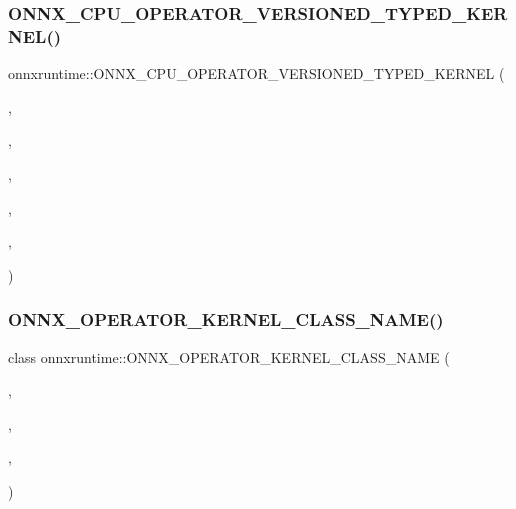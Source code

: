 \subsubsection{\texorpdfstring{O\+N\+N\+X\+\_\+\+C\+P\+U\+\_\+\+O\+P\+E\+R\+A\+T\+O\+R\+\_\+\+V\+E\+R\+S\+I\+O\+N\+E\+D\+\_\+\+T\+Y\+P\+E\+D\+\_\+\+K\+E\+R\+N\+E\+L()}{ONNX\_CPU\_OPERATOR\_VERSIONED\_TYPED\_KERNEL()}\hspace{0.1cm}{\footnotesize\ttfamily [2/2]}}
{\footnotesize\ttfamily onnxruntime\+::\+O\+N\+N\+X\+\_\+\+C\+P\+U\+\_\+\+O\+P\+E\+R\+A\+T\+O\+R\+\_\+\+V\+E\+R\+S\+I\+O\+N\+E\+D\+\_\+\+T\+Y\+P\+E\+D\+\_\+\+K\+E\+R\+N\+EL (\begin{DoxyParamCaption}\item[{\mbox{\hyperlink{classonnxruntime_1_1Greater}{Greater}}}]{,  }\item[{7}]{,  }\item[{9}]{,  }\item[{float}]{,  }\item[{\mbox{\hyperlink{classonnxruntime_1_1KernelDefBuilder}{Kernel\+Def\+Builder}}().Type\+Constraint(\char`\"{}T\char`\"{}, Data\+Type\+Impl\+::\+Get\+Tensor\+Type$<$ float $>$())}]{,  }\item[{\mbox{\hyperlink{classonnxruntime_1_1Greater}{Greater}}$<$ float $>$}]{ }\end{DoxyParamCaption})}

\mbox{\label{namespaceonnxruntime_a12965abed5f8d0fae3ef21bdbd7793dc}} 
\subsubsection{\texorpdfstring{O\+N\+N\+X\+\_\+\+O\+P\+E\+R\+A\+T\+O\+R\+\_\+\+K\+E\+R\+N\+E\+L\+\_\+\+C\+L\+A\+S\+S\+\_\+\+N\+A\+M\+E()}{ONNX\_OPERATOR\_KERNEL\_CLASS\_NAME()}\hspace{0.1cm}{\footnotesize\ttfamily [1/84]}}
{\footnotesize\ttfamily class onnxruntime\+::\+O\+N\+N\+X\+\_\+\+O\+P\+E\+R\+A\+T\+O\+R\+\_\+\+K\+E\+R\+N\+E\+L\+\_\+\+C\+L\+A\+S\+S\+\_\+\+N\+A\+ME (\begin{DoxyParamCaption}\item[{\mbox{\hyperlink{namespaceonnxruntime_a394a3c7e50622de1f203a96df592060d}{k\+Cpu\+Execution\+Provider}}}]{,  }\item[{\mbox{\hyperlink{namespaceonnxruntime_ac0e7c0c106a2c9e9594560a3ab289fa0}{k\+Onnx\+Domain}}}]{,  }\item[{1}]{,  }\item[{\mbox{\hyperlink{classonnxruntime_1_1Shape}{Shape}}}]{ }\end{DoxyParamCaption})}

